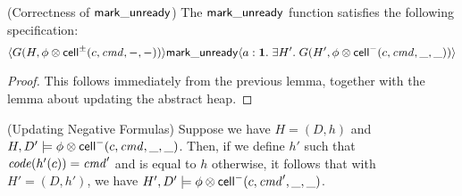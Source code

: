 \begin{lemma}{(Correctness of $\mathsf{mark\_unready}$)}
The $\mathsf{mark\_unready}$ function satisfies the following specification:   
\begin{displaymath}
\langle{G(H, \phi \otimes \mathsf{cell}^{\pm}({c}, {\mathit{cmd}}, {-}, {-}))}\rangle{\mathsf{mark\_unready}}\langle{a:\mathbf{1}}.\;{\exists H'.\;G(H', \phi \otimes \mathsf{cell}^{-}({c}, {\mathit{cmd}}, {\_}, {\_}))}\rangle
\end{displaymath}
\end{lemma}

\begin{proof}
  This follows immediately from the previous lemma, together with the lemma about updating the 
abstract heap. 
\end{proof}


\begin{lemma}{(Updating Negative Formulas)}
Suppose we have  $H = (D,h)$ and $H, D' \models \phi \otimes \mathsf{cell}^{-}({c}, {\mathit{cmd}}, {\_}, {\_})$. Then, if
we define $h'$ such that $\mathit{code}(h'(c)) = \mathit{cmd}'$ and is equal to $h$ otherwise, 
it follows that with $H' = (D,h')$, we have $H', D' \models \phi \otimes \mathsf{cell}^{-}({c}, {\mathit{cmd}'}, {\_}, {\_})$. 
\end{lemma}

